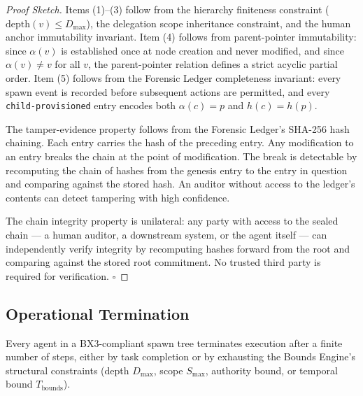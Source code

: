 \begin{proof}[Proof Sketch]
Items (1)–(3) follow from the hierarchy finiteness constraint ($\text{depth}(v) \leq D_{\max}$), the delegation scope inheritance constraint, and the human anchor immutability invariant. Item (4) follows from parent-pointer immutability: since $\alpha(v)$ is established once at node creation and never modified, and since $\alpha(v) \neq v$ for all $v$, the parent-pointer relation defines a strict acyclic partial order. Item (5) follows from the Forensic Ledger completeness invariant: every spawn event is recorded before subsequent actions are permitted, and every \texttt{child-provisioned} entry encodes both $\alpha(c) = p$ and $h(c) = h(p)$.

The tamper-evidence property follows from the Forensic Ledger's SHA-256 hash chaining. Each entry carries the hash of the preceding entry. Any modification to an entry breaks the chain at the point of modification. The break is detectable by recomputing the chain of hashes from the genesis entry to the entry in question and comparing against the stored hash. An auditor without access to the ledger's contents can detect tampering with high confidence.

The chain integrity property is unilateral: any party with access to the sealed chain — a human auditor, a downstream system, or the agent itself — can independently verify integrity by recomputing hashes forward from the root and comparing against the stored root commitment. No trusted third party is required for verification. $\square$
\end{proof}

\subsection{Operational Termination}

\begin{property}
\label{prop:termination}
Every agent in a BX3-compliant spawn tree terminates execution after a finite number of steps, either by task completion or by exhausting the Bounds Engine's structural constraints (depth $D_{\max}$, scope $S_{\max}$, authority bound, or temporal bound $T_{\text{bounds}}$).
\end{property}

